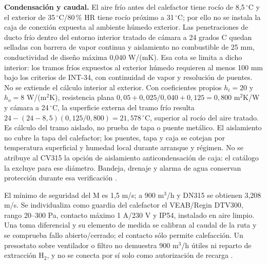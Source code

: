 \textbf{Condensación y caudal.} El aire frío antes del calefactor tiene rocío de 8,5\,$^{\circ}$C y el exterior de 35\,$^{\circ}$C/80\,\% HR tiene rocío próximo a 31\,$^{\circ}$C; por ello no se instala la caja de conexión expuesta al ambiente húmedo exterior. Las penetraciones de ducto frío dentro del entorno interior tratado de cámara a 24 grados C quedan selladas con barrera de vapor continua y aislamiento no combustible de 25 mm, conductividad de diseño máxima 0,040 W/(mK). Esa cota se limita a dicho interior: los tramos fríos expuestos al exterior húmedo requieren al menos 100 mm bajo los criterios de INT-34, con continuidad de vapor y resolución de puentes. No se extiende el cálculo interior al exterior. Con coeficientes propios $h_i=20$ y $h_o=8$ W/(m$^2$K), resistencia plana $0,05+0,025/0,040+0,125=0,800$ m$^2$K/W y cámara a 24\,$^{\circ}$C, la superficie externa del tramo frío resulta $24-(24-8,5)(0,125/0,800)=21,578\,^{\circ}$C, superior al rocío del aire tratado. Es cálculo del tramo aislado, no prueba de tapa o puente metálico. El aislamiento no cubre la tapa del calefactor; los puentes, tapa y caja se cotejan por temperatura superficial y humedad local durante arranque y régimen. No se atribuye al CV315 la opción de aislamiento anticondensación de caja: el catálogo la excluye para ese diámetro. Bandeja, drenaje y alarma de agua conservan protección durante esa verificación \parencite[p.~3]{lote25-veab-cv}.

El mínimo de seguridad del M es 1,5 m/s; a 900 m$^3$/h y DN315 se obtienen 3,208 m/s. Se individualiza como guardia del calefactor el VEAB/Regin DTV300, rango 20--300 Pa, contacto máximo 1 A/230 V y IP54, instalado en aire limpio. Una toma diferencial y su elemento de medida se calibran al caudal de la ruta y se comprueba fallo abierto/cerrado; el contacto sólo permite calefacción. Un presostato sobre ventilador o filtro no demuestra 900 m$^3$/h útiles ni reparto de extracción H$_2$, y no se conecta por sí solo como autorización de recarga \parencite[p.~15]{lote25-veab-cv}.

